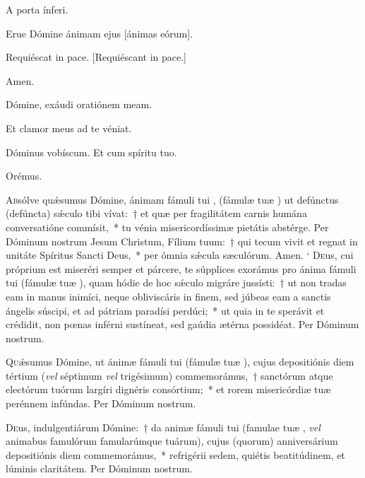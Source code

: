 \documentclass[vesperale_romanum]{subfiles}
\begin{document}

\vv A porta ínferi.

\rr Erue Dómine ánimam ejus [ánimas eórum].

\vv Requiéscat in pace. [Requiéscant in pace.]

\rr Amen.

\vv Dómine, exáudi oratiónem meam.

\rr Et clamor meus ad te véniat.

\vv Dóminus vobíscum. \rr Et cum spíritu tuo.

{\centering Orémus.\par}


\oratio

\lettrine{A}{b}sólve quǽsumus Dómine, ánimam fámuli tui \nomen{}, (fámulæ tuæ \nomen{}) ut defún\-ctus (defún\-cta) sǽculo tibi vívat:~† et quæ per fragilitátem carnis humána conversatióne commísit,~* tu vénia misericordíssimæ pietátis abstérge. Per Dóminum nostrum Jesum Christum, Fílium tuum:~† qui tecum vivit et regnat in unitáte Spíritus Sancti Deus,~* per ómnia sǽcula sæculórum. \rr Amen.
`
\lettrine{D}{e}us, cui próprium est miseréri semper et párcere, te súpplices exorámus pro ánima fámuli tui \nomen{} (fámulæ tuæ \nomen{}),
quam hódie de hoc sǽculo migráre jussísti:~† ut non tradas eam in manus inimíci,
neque obliviscáris in finem, sed júbeas eam a san\-ctis ángelis súscipi, et ad pátriam paradísi perdúci;~* 
ut quia in te sperávit et crédidit, non pœnas inférni sustíneat, sed gaúdia ætérna possidéat. Per Dóminum nostrum.



\lettrine{Q}{u}ǽsumus Dómine, ut ánimæ fámuli tui \nomen{} (fámulæ tuæ \nomen{}), cujus depositiónis diem tértium (\textit{vel} séptimum \textit{vel} trigésimum) commemorámus,~† san\-ctórum atque ele\-ctórum tuórum largíri dignéris consórtium;~* et rorem misericórdiæ tuæ perénnem infúndas. Per Dóminum nostrum.


\lettrine{D}{e}us, indulgentiárum Dómine:~† da animæ fámuli tui \nomen{}
(famulae tuæ \nomen, \textit{vel} animabus famulórum famularúmque
tuárum), cujus (quorum) anniversárium depositiónis diem commemorámus,~* refrigérii sedem, quiétis beatitúdinem, et lúminis
claritátem. Per Dóminum nostrum.
\end{document}
